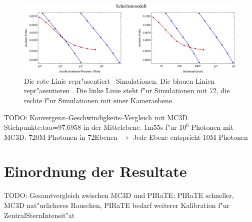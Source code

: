 		\begin{figure}
			\centering
			\includegraphics[width=1.0\textwidth]{diskerrorplot.eps}
			\caption{Die rote Linie repr"asentiert \pirate--Simulationen. Die blauen Linien repr"asentieren \mctd. Die linke Linie steht f"ur Simulationen mit 72, die rechte f"ur Simulationen mit einer Kameraebene.}
			\label{fig:disk_error}
		\end{figure}
	
	
	TODO: Konvergenz--Geschwindigkeits--Vergleich mit MC3D.
	Stichpunkte:tau=97.6958 in der Mittelebene. 1m55s f"ur $10^6$ Photonen mit MC3D. 720M Photonen in 72Ebenen $\rightarrow$ Jede Ebene entspricht 10M Photonen
	\section{Einordnung der Resultate}
	TODO: Gesamtvergleich zwischen MC3D und PIRaTE: PIRaTE schneller, MC3D nat"urlicheres Rauschen, PIRaTE bedarf weiterer Kalibration f"ur ZentralSternIntensit"at
